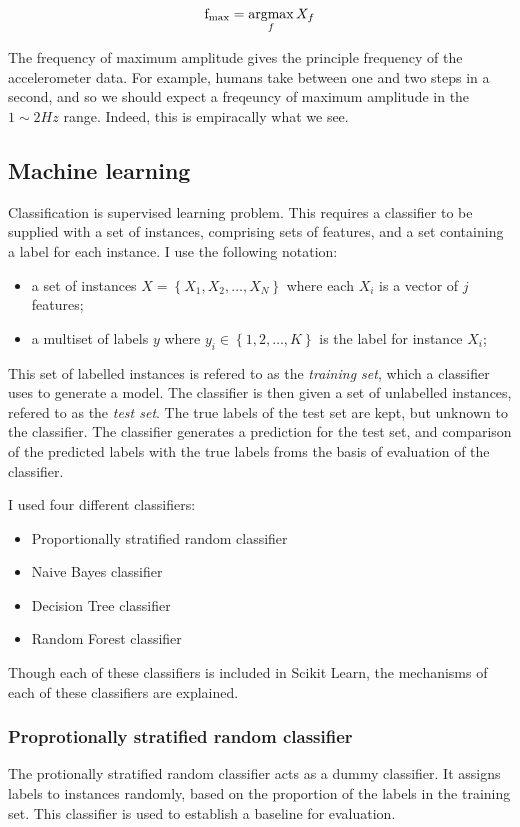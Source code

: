         $$\mathrm{f}_\mathrm{max} = \operatorname*{argmax}_f X_f$$
        
        The frequency of maximum amplitude gives the principle frequency of the accelerometer data. For example, humans take between one and two steps in a second, and so we should expect a freqeuncy of maximum amplitude in the $1 \sim 2 \si{Hz}$ range. Indeed, this is empiracally what we see.
        
    \subsection{Machine learning}
      Classification is supervised learning problem. This requires a classifier to be supplied with a set of instances, comprising sets of features, and a set containing a label for each instance. I use the following notation:
      \begin{itemize}
        \item a set of instances $X = \left\{X_1, X_2, \dots, X_N\right\}$ where each $X_i$ is a vector of $j$ features;
        \item a multiset of labels $y$ where $y_i \in \left\{1, 2, \dots, K\right\}$ is the label for instance $X_i$;
      \end{itemize}  
      
      This set of labelled instances is refered to as the \emph{training set}, which a classifier uses to generate a model. The classifier is then given a set of unlabelled instances, refered to as the \emph{test set}. The true labels of the test set are kept, but unknown to the classifier. The classifier generates a prediction for the test set, and comparison of the predicted labels with the true labels froms the basis of evaluation of the classifier.
      
      I used four different classifiers:
      \begin{itemize}
        \item Proportionally stratified random classifier
        \item Naive Bayes classifier
        \item Decision Tree classifier
        \item Random Forest classifier
      \end{itemize}
      
      Though each of these classifiers is included in Scikit Learn, the mechanisms of each of these classifiers are explained.
      
      \subsubsection{Proprotionally stratified random classifier}
        The protionally stratified random classifier acts as a dummy classifier. It assigns labels to instances randomly, based on the proportion of the labels in the training set. This classifier is used to establish a baseline for evaluation.
        
